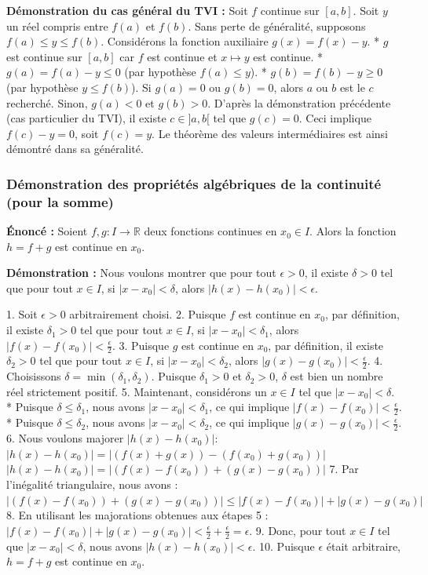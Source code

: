 \documentclass[12pt,a4paper]{report}
\begin{document}
\textbf{Démonstration du cas général du TVI :}
Soit $f$ continue sur $[a, b]$. Soit $y$ un réel compris entre $f(a)$ et $f(b)$.
Sans perte de généralité, supposons $f(a) \le y \le f(b)$.
Considérons la fonction auxiliaire $g(x) = f(x) - y$.
*   $g$ est continue sur $[a, b]$ car $f$ est continue et $x \mapsto y$ est continue.
*   $g(a) = f(a) - y \le 0$ (par hypothèse $f(a) \le y$).
*   $g(b) = f(b) - y \ge 0$ (par hypothèse $y \le f(b)$).
Si $g(a)=0$ ou $g(b)=0$, alors $a$ ou $b$ est le $c$ recherché.
Sinon, $g(a) < 0$ et $g(b) > 0$. D'après la démonstration précédente (cas particulier du TVI), il existe $c \in ]a, b[$ tel que $g(c) = 0$.
Ceci implique $f(c) - y = 0$, soit $f(c) = y$.
Le théorème des valeurs intermédiaires est ainsi démontré dans sa généralité.

\subsubsection{Démonstration des propriétés algébriques de la continuité (pour la somme)}
\textbf{Énoncé :} Soient $f, g : I \to \mathbb{R}$ deux fonctions continues en $x_0 \in I$. Alors la fonction $h = f+g$ est continue en $x_0$.

\textbf{Démonstration :}
Nous voulons montrer que pour tout $\epsilon > 0$, il existe $\delta > 0$ tel que pour tout $x \in I$, si $|x - x_0| < \delta$, alors $|h(x) - h(x_0)| < \epsilon$.

1.  Soit $\epsilon > 0$ arbitrairement choisi.
2.  Puisque $f$ est continue en $x_0$, par définition, il existe $\delta_1 > 0$ tel que pour tout $x \in I$, si $|x - x_0| < \delta_1$, alors $|f(x) - f(x_0)| < \frac{\epsilon}{2}$.
3.  Puisque $g$ est continue en $x_0$, par définition, il existe $\delta_2 > 0$ tel que pour tout $x \in I$, si $|x - x_0| < \delta_2$, alors $|g(x) - g(x_0)| < \frac{\epsilon}{2}$.
4.  Choisissons $\delta = \min(\delta_1, \delta_2)$. Puisque $\delta_1 > 0$ et $\delta_2 > 0$, $\delta$ est bien un nombre réel strictement positif.
5.  Maintenant, considérons un $x \in I$ tel que $|x - x_0| < \delta$.
    *   Puisque $\delta \le \delta_1$, nous avons $|x - x_0| < \delta_1$, ce qui implique $|f(x) - f(x_0)| < \frac{\epsilon}{2}$.
    *   Puisque $\delta \le \delta_2$, nous avons $|x - x_0| < \delta_2$, ce qui implique $|g(x) - g(x_0)| < \frac{\epsilon}{2}$.
6.  Nous voulons majorer $|h(x) - h(x_0)|$:
    $|h(x) - h(x_0)| = |(f(x) + g(x)) - (f(x_0) + g(x_0))|$
    $|h(x) - h(x_0)| = |(f(x) - f(x_0)) + (g(x) - g(x_0))|$
7.  Par l'inégalité triangulaire, nous avons :
    $|(f(x) - f(x_0)) + (g(x) - g(x_0))| \le |f(x) - f(x_0)| + |g(x) - g(x_0)|$
8.  En utilisant les majorations obtenues aux étapes 5 :
    $|f(x) - f(x_0)| + |g(x) - g(x_0)| < \frac{\epsilon}{2} + \frac{\epsilon}{2} = \epsilon$.
9.  Donc, pour tout $x \in I$ tel que $|x - x_0| < \delta$, nous avons $|h(x) - h(x_0)| < \epsilon$.
10. Puisque $\epsilon$ était arbitraire, $h = f+g$ est continue en $x_0$.
\end{document}
